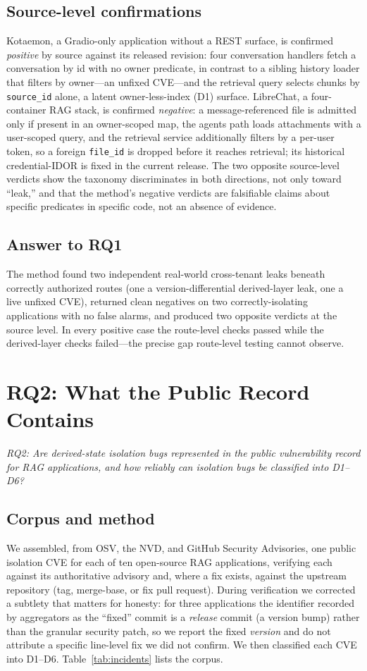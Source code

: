 \IfFileExists{IEEEtran.cls}{\documentclass[conference]{IEEEtran}}{\documentclass[10pt,twocolumn]{article}}
\newcommand{\code}[1]{\texttt{\small #1}}
\begin{document}
\subsection{Source-level confirmations}
Kotaemon, a Gradio-only application without a REST surface, is confirmed \emph{positive} by source
against its released revision: four conversation handlers fetch a conversation by id with no owner
predicate, in contrast to a sibling history loader that filters by owner---an unfixed CVE---and the
retrieval query selects chunks by \code{source\_id} alone, a latent owner-less-index (D1) surface.
LibreChat, a four-container RAG stack, is confirmed \emph{negative}: a message-referenced file is
admitted only if present in an owner-scoped map, the agents path loads attachments with a
user-scoped query, and the retrieval service additionally filters by a per-user token, so a foreign
\code{file\_id} is dropped before it reaches retrieval; its historical credential-IDOR is fixed in
the current release. The two opposite source-level verdicts show the taxonomy discriminates in both
directions, not only toward ``leak,'' and that the method's negative verdicts are falsifiable claims
about specific predicates in specific code, not an absence of evidence.

\subsection{Answer to RQ1}
The method found two independent real-world cross-tenant leaks beneath correctly authorized routes
(one a version-differential derived-layer leak, one a live unfixed CVE), returned clean negatives on
two correctly-isolating applications with no false alarms, and produced two opposite verdicts at the
source level. In every positive case the route-level checks passed while the derived-layer checks
failed---the precise gap route-level testing cannot observe.

\section{RQ2: What the Public Record Contains}
\label{sec:ea2}
\emph{RQ2: Are derived-state isolation bugs represented in the public vulnerability record for RAG
applications, and how reliably can isolation bugs be classified into D1--D6?}

\subsection{Corpus and method}
We assembled, from OSV, the NVD, and GitHub Security Advisories, one public isolation CVE for each of
ten open-source RAG applications, verifying each against its authoritative advisory and, where a fix
exists, against the upstream repository (tag, merge-base, or fix pull request). During verification
we corrected a subtlety that matters for honesty: for three applications the identifier recorded by
aggregators as the ``fixed'' commit is a \emph{release} commit (a version bump) rather than the
granular security patch, so we report the fixed \emph{version} and do not attribute a specific
line-level fix we did not confirm. We then classified each CVE into D1--D6.
Table~\ref{tab:incidents} lists the corpus.
\end{document}
